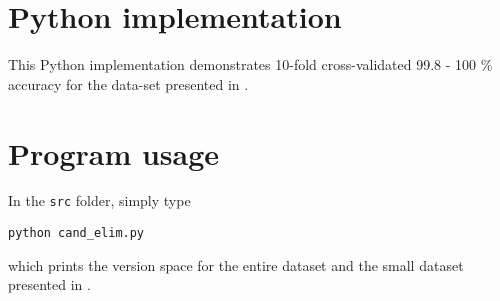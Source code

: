 \section{Python implementation}

This Python implementation demonstrates 10-fold cross-validated 99.8 - 100 \% accuracy for the data-set presented in \cite{mitchell}.


\section{Program usage}

In the \texttt{src} folder, simply type

\centerline{\texttt{python cand\_elim.py}}

\vspace{2mm}
\noindent which prints the version space for the entire dataset and the small dataset presented in \cite{mitchell}.

